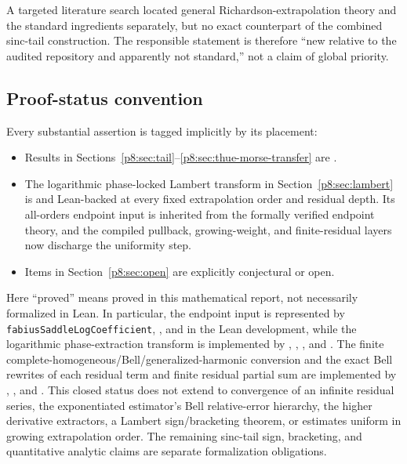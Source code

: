 \documentclass[11pt]{article}
\numberwithin{equation}{section}
\theoremstyle{definition}
\theoremstyle{remark}
\begin{document}
A targeted literature search located general Richardson-extrapolation theory and the standard ingredients separately, but no exact counterpart of the combined sinc-tail construction. The responsible statement is therefore ``new relative to the audited repository and apparently not standard,'' not a claim of global priority.

\subsection{Proof-status convention}

Every substantial assertion is tagged implicitly by its placement:
\begin{itemize}
\item Results in Sections~\ref{p8:sec:tail}--\ref{p8:sec:thue-morse-transfer} are \statusprovedPartll.
\item The logarithmic phase-locked Lambert transform in
Section~\ref{p8:sec:lambert} is \statusprovedPartll{} and Lean-backed at every
fixed extrapolation order and residual depth.  Its all-orders endpoint input is
inherited from the formally verified endpoint theory, and the compiled
pullback, growing-weight, and finite-residual layers now discharge the
uniformity step.
\item Items in Section~\ref{p8:sec:open} are explicitly conjectural or open.
\end{itemize}
Here ``proved'' means proved in this mathematical report, not necessarily formalized in
Lean.  In particular, the endpoint input is represented by
\texttt{fabiusSaddleLogCoefficient},
, and
 in the Lean development,
while the logarithmic phase-extraction transform is implemented by
,
,
, and
.  The finite
complete-homogeneous/Bell/generalized-harmonic conversion and the exact
Bell rewrites of each residual term and finite residual partial sum are
implemented by ,
, and
.  This closed status does not
extend to convergence of an infinite residual series, the exponentiated
estimator's Bell relative-error hierarchy, the higher derivative extractors,
a Lambert sign/bracketing theorem, or estimates uniform in growing
extrapolation order.  The remaining sinc-tail sign, bracketing, and
quantitative analytic claims are separate formalization obligations.
\end{document}

